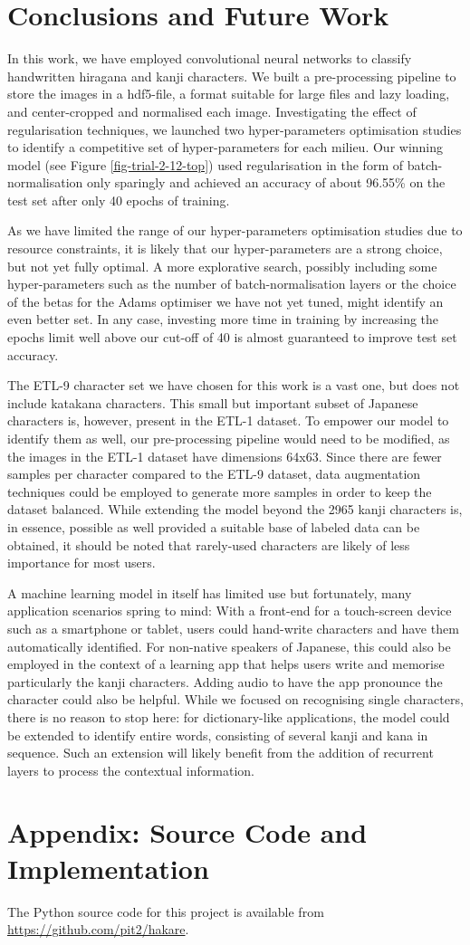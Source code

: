 \documentclass[british,12p]{article}
\begin{document}
    \section{Conclusions and Future Work}
    In this work, we have employed convolutional neural networks to classify handwritten hiragana and kanji characters. We built a pre-processing pipeline to store the images in a hdf5-file, a format suitable for large files and lazy loading, and center-cropped and normalised each image. Investigating the effect of regularisation techniques, we launched two hyper-parameters optimisation studies to identify a competitive set of hyper-parameters for each milieu. Our winning model (see Figure \ref{fig-trial-2-12-top}) used regularisation in the form of batch-normalisation only sparingly and achieved an accuracy of about 96.55\% on the test set after only 40 epochs of training. 
    
    As we have limited the range of our hyper-parameters optimisation studies due to resource constraints, it is likely that our hyper-parameters are a strong choice, but not yet fully optimal. A more explorative search, possibly including some hyper-parameters such as the number of batch-normalisation layers or the choice of the betas for the Adams optimiser we have not yet tuned, might identify an even better set. In any case, investing more time in training by increasing the epochs limit well above our cut-off of 40 is almost guaranteed to improve test set accuracy. 
    
    The ETL-9 character set we have chosen for this work is a vast one, but does not include katakana characters. This small but important subset of Japanese characters is, however, present in the ETL-1 dataset. To empower our model to identify them as well, our pre-processing pipeline would need to be modified, as the images in the ETL-1 dataset have dimensions 64x63. Since there are fewer samples per character compared to the ETL-9 dataset, data augmentation techniques could be employed to generate more samples in order to keep the dataset balanced. While extending the model beyond the 2965 kanji characters is, in essence, possible as well provided a suitable base of labeled data can be obtained, it should be noted that rarely-used characters are likely of less importance for most users.
    
    A machine learning model in itself has limited use but fortunately, many application scenarios spring to mind:
    With a front-end for a touch-screen device such as a smartphone or tablet, users could hand-write characters and have them automatically identified.  For non-native speakers of Japanese, this could also be employed in the context of a learning app that helps users write and memorise particularly the kanji characters. Adding audio to have the app pronounce the character could also be helpful. While we focused on recognising single characters, there is no reason to stop here: for dictionary-like applications, the model could be extended to identify entire words, consisting of several kanji and kana in sequence. Such an extension will likely benefit from the addition of recurrent layers to process the contextual information. 
        
      \printbibliography
    \section*{Appendix: Source Code and Implementation}
    The Python source code for this project is available from \url{https://github.com/pit2/hakare}.
    
\end{document}
